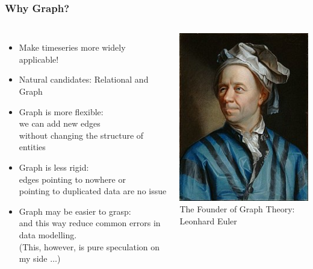 \documentclass[mathserif,usenames,dvipsnames]{beamer}
\begin{document}
\begin{frame}
\frametitle{Why Graph?}
\begin{columns}[T]
\begin{itemize}
\item Make timeseries more widely applicable!
\item Natural candidates: Relational and Graph
\item Graph is more flexible:\\
      we can add new edges \\
      without changing the structure of entities
\item Graph is less rigid:\\
      edges pointing to nowhere or\\
            pointing to duplicated data are no issue
\item Graph may be easier to grasp:\\
      and this way reduce common errors in data modelling.\\
      (This, however, is pure speculation on my side $\dots$)
\end{itemize}
\begin{center}
\vskip0.8cm
\linewidth
\includegraphics[width=0.75\linewidth]{leoeuler.jpg}\\
\vskip-0.2cm
\hskip-0.6cm
{\tiny The Founder of Graph Theory:}
\vskip-0.2cm
\hskip-0.6cm
{\tiny Leonhard Euler}
\end{center}
\end{columns}
\end{frame}
\end{document}
